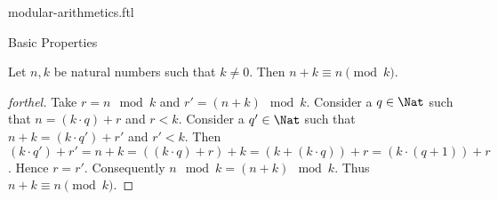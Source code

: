 \documentclass{naproche-library}
\begin{document}
\begin{smodule}[title=Modular Arithmetics]{modular-arithmetics.ftl}
\begin{sfragment}{Basic Properties}
  \begin{proposition}[forthel,id=ARITHMETIC_08_5984712287846400]
    Let $n, k$ be natural numbers such that $k \neq 0$.
    Then $n + k \equiv n \pmod{k}$.
  \end{proposition}
  \begin{proof}[forthel]
    Take $r = n \mod k$ and $r' = (n + k) \mod k$.
    Consider a $q \in \Nat$ such that $n = (k \cdot q) + r$ and $r < k$.
    Consider a $q' \in \Nat$ such that $n + k = (k \cdot q') + r'$ and
    $r' < k$.
    Then $(k \cdot q') + r'
      = n + k
      = ((k \cdot q) + r) + k
      = (k + (k \cdot q)) + r
      = (k \cdot (q + 1)) + r$.
    Hence $r = r'$.
    Consequently $n \mod k = (n + k) \mod k$.
    Thus $n + k \equiv n \pmod{k}$.
  \end{proof}
\end{sfragment}
\end{smodule}
\end{document}
